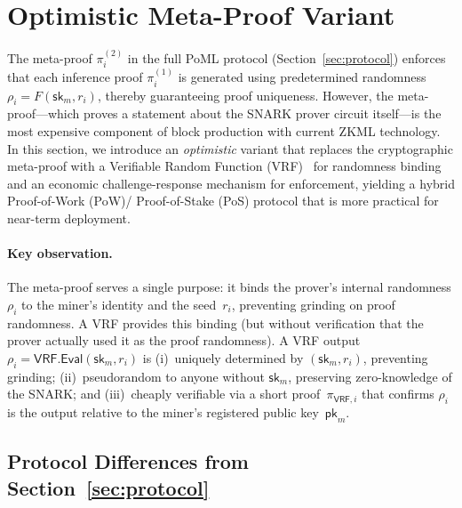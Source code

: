 \section{Optimistic Meta-Proof Variant}
\label{sec:optimistic}

The meta-proof $\pi_i^{(2)}$ in the full PoML protocol (Section~\ref{sec:protocol}) enforces that each inference proof $\pi_i^{(1)}$ is generated using predetermined randomness $\rho_i = F(\mathsf{sk}_m, r_i)$, thereby guaranteeing proof uniqueness. However, the meta-proof---which proves a statement about the SNARK prover circuit itself---is the most expensive component of block production with current ZKML technology. In this section, we introduce an \emph{optimistic} variant that replaces the cryptographic meta-proof with a Verifiable Random Function (VRF)~\cite{micali1999vrf} for randomness binding and an economic challenge-response mechanism for enforcement, yielding a hybrid Proof-of-Work (PoW)/ Proof-of-Stake (PoS) protocol that is more practical for near-term deployment.

\paragraph{Key observation.}
The meta-proof serves a single purpose: it binds the prover's internal randomness $\rho_i$ to the miner's identity and the seed~$r_i$, preventing grinding on proof randomness. A VRF provides this binding (but without verification that the prover actually used it as the proof randomness). A VRF output $\rho_i = \mathsf{VRF.Eval}(\mathsf{sk}_m, r_i)$ is (i)~uniquely determined by $(\mathsf{sk}_m, r_i)$, preventing grinding; (ii)~pseudorandom to anyone without $\mathsf{sk}_m$, preserving zero-knowledge of the SNARK; and (iii)~cheaply verifiable via a short proof~$\pi_{\mathsf{VRF},i}$  that confirms $\rho_i$ is the output relative to the miner's registered public key~$\mathsf{pk}_m$.

\subsection{Protocol Differences from Section~\ref{sec:protocol}}
\label{subsec:opt-diffs}

